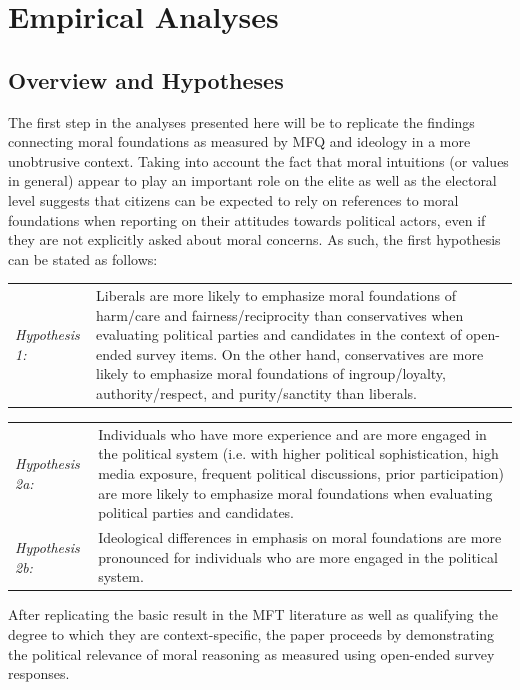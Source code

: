 \documentclass[12pt]{paper}
\begin{document}
\section{Empirical Analyses}

\subsection{Overview and Hypotheses}

The first step in the analyses presented here will be to replicate the findings connecting moral foundations as measured by MFQ and ideology in a more unobtrusive context. Taking into account the fact that moral intuitions (or values in general) appear to play an important role on the elite as well as the electoral level suggests that citizens can be expected to rely on references to moral foundations when reporting on their attitudes towards political actors, even if they are not explicitly asked about moral concerns. As such, the first hypothesis can be stated as follows:

\vspace{0.3cm}
\begin{tabular}{lp{12cm}}
\textsl{Hypothesis 1:} & Liberals are more likely to emphasize moral foundations of harm/care and fairness/reciprocity  than conservatives when evaluating political parties and candidates in the context of open-ended survey items. On the other hand, conservatives are more likely to emphasize moral foundations of ingroup/loyalty, authority/respect, and purity/sanctity than liberals.
\end{tabular}
\vspace{0.5cm}


\vspace{0.3cm}
\begin{tabular}{lp{12cm}}
\textsl{Hypothesis 2a:} & Individuals who have more experience and are more engaged in the political system (i.e. with higher political sophistication, high media exposure, frequent political discussions, prior participation) are more likely to emphasize moral foundations when evaluating political parties and candidates. \\
\textsl{Hypothesis 2b:} & Ideological differences in emphasis on moral foundations are more pronounced for individuals who are more engaged in the political system.
\end{tabular}
\vspace{0.5cm}

After replicating the basic result in the MFT literature as well as qualifying the degree to which they are context-specific, the paper proceeds by demonstrating the political relevance of moral reasoning as measured using open-ended survey responses.
\end{document}
